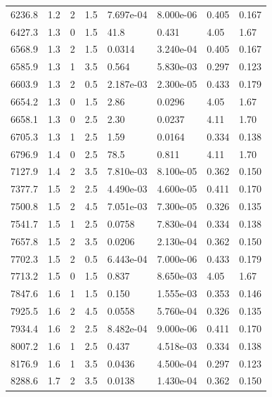 \documentclass[preview]{standalone}
\begin{document}
{{{\begin{tabular}{L{1.2cm}C{1.2cm} C{0.3cm}C{0.5cm} C{1.4cm}C{1.4cm} C{1.4cm}C{1.4cm}}
  6236.8  &   1.2  & 2     & 1.5 &  7.697e-04  & 8.000e-06  & 0.405 &  0.167   \\ 
  6427.3  &   1.3  & 0     & 1.5 &  41.8  & 0.431  & 4.05 &  1.67   \\ 
  6568.9  &   1.3  & 2     & 1.5 &  0.0314  & 3.240e-04  & 0.405 &  0.167   \\ 
  6585.9  &   1.3  & 1     & 3.5 &  0.564  & 5.830e-03  & 0.297 &  0.123   \\ 
  6603.9  &   1.3  & 2     & 0.5 &  2.187e-03  & 2.300e-05  & 0.433 &  0.179   \\ 
  6654.2  &   1.3  & 0     & 1.5 &  2.86  & 0.0296  & 4.05 &  1.67   \\ 
  6658.1  &   1.3  & 0     & 2.5 &  2.30  & 0.0237  & 4.11 &  1.70   \\ 
  6705.3  &   1.3  & 1     & 2.5 &  1.59  & 0.0164  & 0.334 &  0.138   \\ 
  6796.9  &   1.4  & 0     & 2.5 &  78.5  & 0.811  & 4.11 &  1.70   \\ 
  7127.9  &   1.4  & 2     & 3.5 &  7.810e-03  & 8.100e-05  & 0.362 &  0.150   \\ 
  7377.7  &   1.5  & 2     & 2.5 &  4.490e-03  & 4.600e-05  & 0.411 &  0.170   \\ 
  7500.8  &   1.5  & 2     & 4.5 &  7.051e-03  & 7.300e-05  & 0.326 &  0.135   \\ 
  7541.7  &   1.5  & 1     & 2.5 &  0.0758  & 7.830e-04  & 0.334 &  0.138   \\ 
  7657.8  &   1.5  & 2     & 3.5 &  0.0206  & 2.130e-04  & 0.362 &  0.150   \\ 
  7702.3  &   1.5  & 2     & 0.5 &  6.443e-04  & 7.000e-06  & 0.433 &  0.179   \\ 
  7713.2  &   1.5  & 0     & 1.5 &  0.837  & 8.650e-03  & 4.05 &  1.67   \\ 
  7847.6  &   1.6  & 1     & 1.5 &  0.150  & 1.555e-03  & 0.353 &  0.146   \\ 
  7925.5  &   1.6  & 2     & 4.5 &  0.0558  & 5.760e-04  & 0.326 &  0.135   \\ 
  7934.4  &   1.6  & 2     & 2.5 &  8.482e-04  & 9.000e-06  & 0.411 &  0.170   \\ 
  8007.2  &   1.6  & 1     & 2.5 &  0.437  & 4.518e-03  & 0.334 &  0.138   \\ 
  8176.9  &   1.6  & 1     & 3.5 &  0.0436  & 4.500e-04  & 0.297 &  0.123   \\ 
  8288.6  &   1.7  & 2     & 3.5 &  0.0138  & 1.430e-04  & 0.362 &  0.150   \\ 

\end{tabular}}}}
\end{document}
